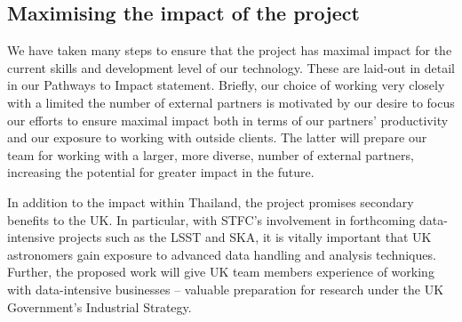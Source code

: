 \documentclass[11pt]{article}
\begin{document}
\subsection{Maximising the impact of the project}
We have taken many steps to ensure that the project has maximal impact for the current skills and development level of our technology. These are laid-out in detail in our Pathways to Impact statement. Briefly, our choice of working very closely with a limited the number of external partners is motivated by our desire to focus our efforts to ensure maximal impact both in terms of our partners' productivity and our exposure to working with outside clients. The latter will prepare our team for working with a larger, more diverse, number of external partners, increasing the potential for greater impact in the future.

\vspace{2mm}
\noindent
In addition to the impact within Thailand, the project promises secondary benefits to the UK. In particular, with STFC's involvement in forthcoming data-intensive projects such as the LSST and SKA, it is vitally important that UK astronomers gain exposure to advanced data handling and analysis techniques. Further, the proposed work will give UK team members experience of working with data-intensive businesses -- valuable preparation for research under the UK Government's Industrial Strategy.

\end{document}
